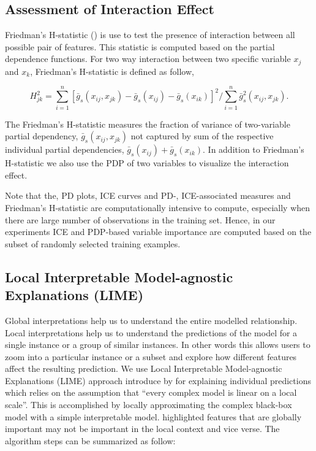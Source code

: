 \documentclass[11pt,a4paper,]{article}
\begin{document}
\subsection{Assessment of Interaction
Effect}\label{assessment-of-interaction-effect}

Friedman's H-statistic (\textcite{friedman2008predictive}) is use to
test the presence of interaction between all possible pair of features.
This statistic is computed based on the partial dependence functions.
For two way interaction between two specific variable \(x_j\) and
\(x_k\), Friedman's H-statistic is defined as follow,

\[H_{jk}^2=\sum_{i=1}^{n}[\bar{g}_{s}(x_{ij}, x_{jk})-\bar{g}_{s}(x_{ij})-\bar{g}_{s}(x_{ik})]^2/\sum_{i=1}^{n}\bar{g}^2_{s}(x_{ij}, x_{jk}).\]

The Friedman's H-statistic measures the fraction of variance of
two-variable partial dependency, \(\bar{g}_{s}(x_{ij}, x_{jk})\) not
captured by sum of the respective individual partial dependencies,
\(\bar{g}_{s}(x_{ij})+\bar{g}_{s}(x_{ik})\). In addition to Friedman's
H-statistic we also use the PDP of two variables to visualize the
interaction effect.

Note that the, PD plots, ICE curves and PD-, ICE-associated measures and
Friedman's H-statistic are computationally intensive to compute,
especially when there are large number of observations in the training
set. Hence, in our experiments ICE and PDP-based variable importance are
computed based on the subset of randomly selected training examples.

\subsection{Local Interpretable Model-agnostic Explanations
(LIME)}\label{local-interpretable-model-agnostic-explanations-lime}

Global interpretations help us to understand the entire modelled
relationship. Local interpretations help us to understand the
predictions of the model for a single instance or a group of similar
instances. In other words this allows users to zoom into a particular
instance or a subset and explore how different features affect the
resulting prediction. We use Local Interpretable Model-agnostic
Explanations (LIME) approach introduce by \textcite{ribeiro2016should}
for explaining individual predictions which relies on the assumption
that ``every complex model is linear on a local scale''. This is
accomplished by locally approximating the complex black-box model with a
simple interpretable model. \textcite{ribeiro2016should} highlighted
features that are globally important may not be important in the local
context and vice verse. The algorithm steps can be summarized as follow:
\end{document}

